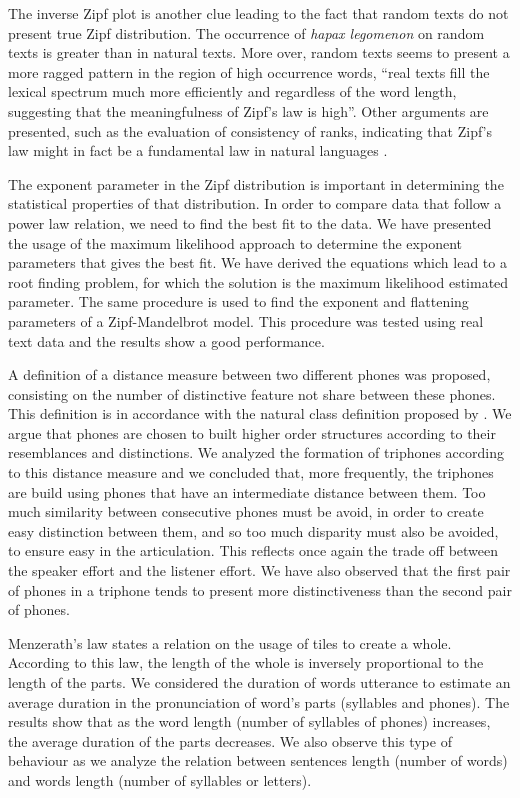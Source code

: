 The inverse Zipf plot is another clue leading to the fact
that random texts do not present true Zipf distribution. 
The occurrence of \emph{hapax legomenon} on random texts is 
greater than in natural texts.
More over, random texts seems to present a more ragged pattern in the region
of high occurrence words, 
``real texts fill the lexical spectrum much more efficiently and
regardless of the word length, suggesting that the meaningfulness of Zipf’s law is high''\citep{cancho2002}.
Other arguments are presented, such as the evaluation of consistency of ranks, 
indicating that Zipf's law might in fact be a fundamental law in natural languages
\citep{cancho2009,cancho2010}.

The exponent parameter in the Zipf distribution is important in determining the
statistical properties of that distribution. In order to compare data that follow
a power law relation, we need to find the best fit to the data. We have presented 
the usage of the maximum likelihood approach to determine the exponent parameters
that gives the best fit. We have derived the equations which lead to a root finding
problem, for which the solution is the maximum likelihood estimated parameter.
The same procedure is used to find the exponent and flattening parameters of
a Zipf-Mandelbrot model. This procedure was tested using real text data
and the results show a good performance. 
 

A definition of a distance measure between two different phones was proposed, 
consisting on the number of distinctive feature not share between these phones.
This definition is in accordance with the natural class definition proposed by \cite{flemming2005}.
We argue that phones are chosen to built higher order structures according to their
resemblances and distinctions. We analyzed the formation of triphones according
to this distance measure and we concluded that, more frequently, the triphones
are build using phones that have an intermediate distance between them. 
Too much similarity between consecutive phones must be avoid, in order to create
easy distinction between them, and so too much disparity must also be avoided,
to ensure easy in the articulation. This reflects once again the trade off
between the speaker effort and the listener effort. We have also observed that
the first pair of phones in a triphone tends to present more distinctiveness than the
second pair of phones.

Menzerath's law states a relation on the usage of tiles to create a whole.
According to this law, the length of the whole is inversely proportional
to the length of the parts. We considered the duration of words utterance to estimate
an average duration in the pronunciation of word's parts (syllables and phones). 
The results show that as the word length (number of syllables of phones) increases,
the average duration of the parts decreases. We also observe this type of behaviour as
we analyze the relation between sentences length (number of words) and words length 
(number of syllables or letters).

